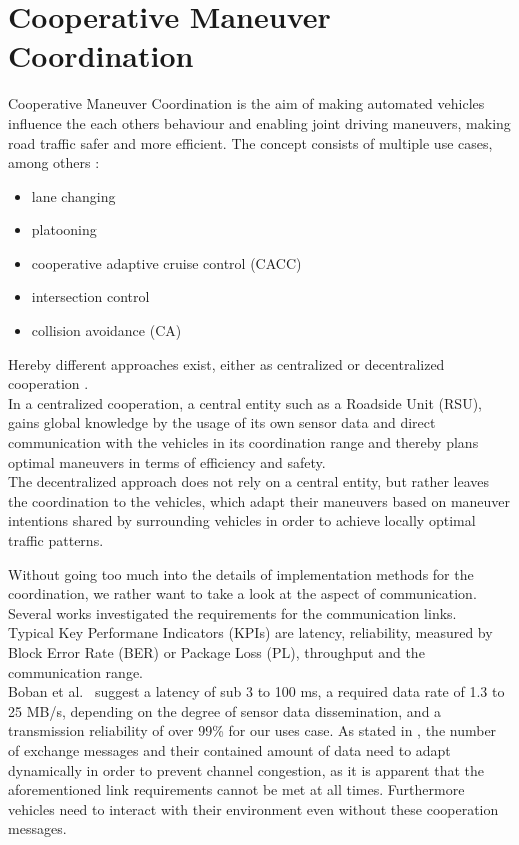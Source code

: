 \documentclass[conference]{IEEEtran}
\begin{document}
\section{Cooperative Maneuver Coordination}\label{sec:cvmc}
Cooperative Maneuver Coordination is the aim of making automated vehicles influence the each others behaviour and enabling joint driving maneuvers, making road traffic safer and more efficient.
The concept consists of multiple use cases, among others \cite{bobanConnectedRoadsFuture2018}:
\begin{itemize}
\item lane changing
\item platooning
\item cooperative adaptive cruise control (CACC)
\item intersection control
\item collision avoidance (CA)
\end{itemize}
Hereby different approaches exist, either as centralized \cite{mengluICTInfrastructureCooperative2018} or decentralized cooperation \cite{llatserCooperativeAutomatedDriving2019,fortelleNetworkAutomatedVehicles2014}.\\
In a centralized cooperation, a central entity such as a Roadside Unit (RSU), gains global knowledge by the usage of its own sensor data and direct communication with the vehicles in its coordination range and thereby plans optimal maneuvers in terms of efficiency and safety.\\
The decentralized approach does not rely on a central entity, but rather leaves the coordination to the vehicles, which adapt their maneuvers based on maneuver intentions shared by surrounding vehicles in order to achieve locally optimal traffic patterns.

Without going too much into the details of implementation methods for the coordination, we rather want to take a look at the aspect of communication. Several works investigated the requirements for the communication links.\\
Typical Key Performane Indicators (KPIs) are latency, reliability, measured by Block Error Rate (BER) or Package Loss (PL), throughput and the communication range.\\
Boban et al.~\cite{bobanConnectedRoadsFuture2018} suggest a latency of sub 3 to 100 ms, a required data rate of 1.3 to 25 MB/s, depending on the degree of sensor data dissemination, and a transmission reliability of over 99\% for our uses case. As stated in \cite{llatserCooperativeAutomatedDriving2019}, the number of exchange messages and their contained amount of data need to adapt dynamically in order to prevent channel congestion, as it is apparent that the aforementioned link requirements cannot be met at all times. Furthermore vehicles need to interact with their environment even without these cooperation messages.
\end{document}

